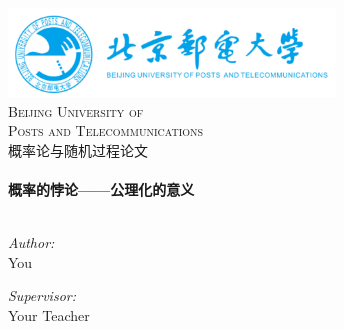 \begin{titlepage}

    \begin{center}


        \includegraphics[width=0.65\textwidth]{figure/logo}\\[1cm]

        \textsc{\LARGE Beijing University of}\\[1.5cm]

        \textsc{\LARGE Posts and Telecommunications}\\[1.5cm]


        \textsc{\Large 概率论与随机过程论文}\\[0.5cm]


        \HRule \\[0.6cm]
        { \huge \bfseries 概率的悖论——公理化的意义}\\[0.4cm]

        \HRule \\[1.0cm]

        \begin{minipage}{0.4\textwidth}
            \begin{flushleft} \large
                \emph{Author:}\\
                You
            \end{flushleft}
        \end{minipage}
        \begin{minipage}{0.4\textwidth}
            \begin{flushright} \large
                \emph{Supervisor:} \\
                Your Teacher
            \end{flushright}
        \end{minipage}

        \vfill


    \end{center}

\end{titlepage}
